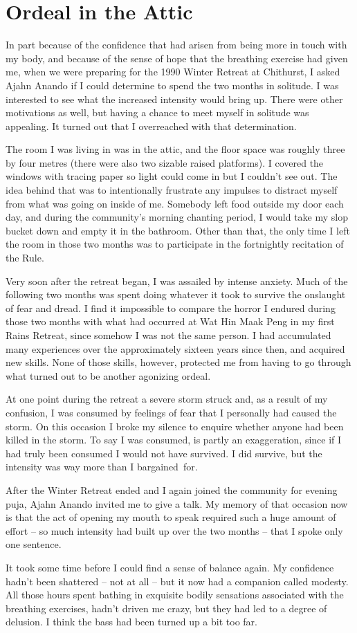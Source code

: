 \chapter{Ordeal in the Attic}

In part because of the confidence that had arisen from being more in
touch with my body, and because of the sense of hope that the breathing
exercise had given me, when we were preparing for the 1990 Winter
Retreat at Chithurst, I asked Ajahn Anando if I could determine to spend
the two months in solitude. I was interested to see what the increased
intensity would bring up. There were other motivations as well, but
having a chance to meet myself in solitude was appealing. It turned out
that I overreached with that determination.

The room I was living in was in the attic, and the floor space was
roughly three by four metres (there were also two sizable raised
platforms). I covered the windows with tracing paper so light could come
in but I couldn't see out. The idea behind that was to intentionally
frustrate any impulses to distract myself from what was going on inside
of me. Somebody left food outside my door each day, and during the
community's morning chanting period, I would take my slop bucket down
and empty it in the bathroom. Other than that, the only time I left the
room in those two months was to participate in the fortnightly
recitation of the Rule.

Very soon after the retreat began, I was assailed by intense anxiety.
Much of the following two months was spent doing whatever it took to
survive the onslaught of fear and dread. I find it impossible to compare
the horror I endured during those two months with what had occurred at
Wat Hin Maak Peng in my first Rains Retreat, since somehow I was not the
same person. I had accumulated many experiences over the approximately
sixteen years since then, and acquired new skills. None of those skills,
however, protected me from having to go through what turned out to be
another agonizing ordeal.

At one point during the retreat a severe storm struck and, as a result
of my confusion, I was consumed by feelings of fear that I personally
had caused the storm. On this occasion I broke my silence to enquire
whether anyone had been killed in the storm. To say I was consumed, is
partly an exaggeration, since if I had truly been consumed I would not
have survived. I did survive, but the intensity was way more than I
bargained~for.

After the Winter Retreat ended and I again joined the community for
evening puja, Ajahn Anando invited me to give a talk. My memory of that
occasion now is that the act of opening my mouth to speak required such
a huge amount of effort -- so much intensity had built up over the two
months -- that I spoke only one sentence.

It took some time before I could find a sense of balance again. My
confidence hadn't been shattered -- not at all -- but it now had a
companion called modesty. All those hours spent bathing in exquisite
bodily sensations associated with the breathing exercises, hadn't driven
me crazy, but they had led to a degree of delusion. I think the bass had
been turned up a bit too far.

